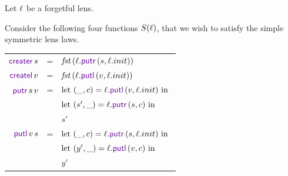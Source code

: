 \documentclass[acmsmall,screen,anonymous]{acmart}
\begin{document}
\begin{definition}[S]
  Let $\mathit{\ell}$ be a forgetful lens.

  Consider the following four functions $S(\mathit{\ell})$, that we wish to satisfy the
  simple symmetric lens laws.

  \begin{centering}
    \begin{tabular}{@{}r@{\ }c@{\ }l@{}}
      $\CreateR{} \App s$
      & =
      & $\Fst \App (\Lens.\PutR{} \App (s,\Lens.init))$\\
      
      $\CreateL{} \App v$
      & =
      & $\Fst \App (\Lens.\PutL{} \App (v,\Lens.init))$\\
      
      $\PutR{} \App s \App v$
      & =
      & $\LetIn{(\_,c)}{\Lens.\PutL \App (v,\Lens.init)}$\\
      &
      & $\LetIn{(s',\_)}{\Lens.\PutR \App (s,c)}$\\
      &
      & $s'$\\
      
      $\PutL{} \App v \App s$
      & =
      & $\LetIn{(\_,c)}{\Lens.\PutR \App (s,\Lens.init)}$\\
      &
      & $\LetIn{(y',\_)}{\Lens.\PutL \App (v,c)}$\\
      &
      & $y'$\\
    \end{tabular}
  \end{centering}
\end{definition}
\end{document}
